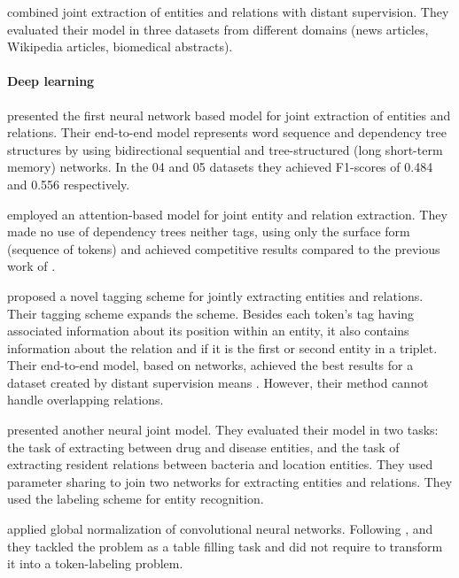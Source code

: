 \textcite{ren2017a} combined joint extraction of entities and relations with distant supervision. They evaluated their model in three datasets from different domains (news articles, Wikipedia articles, biomedical abstracts).


\paragraph{Deep learning}

\textcite{miwa2016a} presented the first neural network based model for joint extraction of entities and relations.
Their end-to-end model represents word sequence and dependency tree structures by using bidirectional sequential and tree-structured  (long short-term memory) networks. In the 04 and 05 datasets they achieved F1-scores of 0.484 and 0.556 respectively.

\textcite{katiyar2017a} employed an attention-based  model for joint entity and relation extraction.
They made no use of dependency trees neither  tags, using only the surface form (sequence of tokens) and achieved competitive results compared to the previous work of \textcite{miwa2016a}.

\textcite{zheng2017a} proposed a novel tagging scheme for jointly extracting entities and relations.
Their tagging scheme expands the  scheme.
Besides each token's tag having associated information about its position within an entity, it also contains information about the relation and if it is the first or second entity in a triplet.
Their end-to-end model, based on  networks, achieved the best results for a dataset created by distant supervision means \parencite{ren2017a}.
However, their method cannot handle overlapping relations.

\textcite{li2017a} presented another neural joint model.
They evaluated their model in two tasks: the task of extracting  between drug and disease entities, and the task of extracting resident relations between bacteria and location entities.
They used parameter sharing to join two  networks for extracting entities and relations.
They used the  labeling scheme for entity recognition.

\textcite{adel2017a} applied global normalization of convolutional neural networks.
Following \textcite{miwa2014a}, and \textcite{gupta2016a} they tackled the problem as a table filling task and did not require to transform it into a token-labeling problem.

